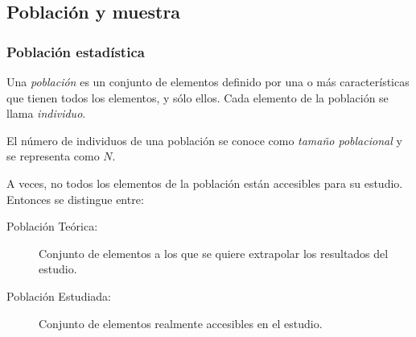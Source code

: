 \subsection{Población y muestra}
\begin{frame}
\frametitle{Población estadística}
\begin{definicion}[Población]
Una \emph{población} es un conjunto de elementos definido por una o más características que tienen todos los elementos, y sólo ellos.
Cada elemento de la población se llama \emph{individuo}.
\end{definicion}

\begin{definicion}
El número de individuos de una población se conoce como \emph{tamaño poblacional} y se representa como $N$.
\end{definicion}

A veces, no todos los elementos de la población están accesibles para su estudio.
Entonces se distingue entre:
\begin{description}
\item [Población Teórica:] Conjunto de elementos a los que se quiere extrapolar los resultados del estudio.
\item [Población Estudiada:] Conjunto de elementos realmente accesibles en el estudio.
\end{description}
\end{frame}
